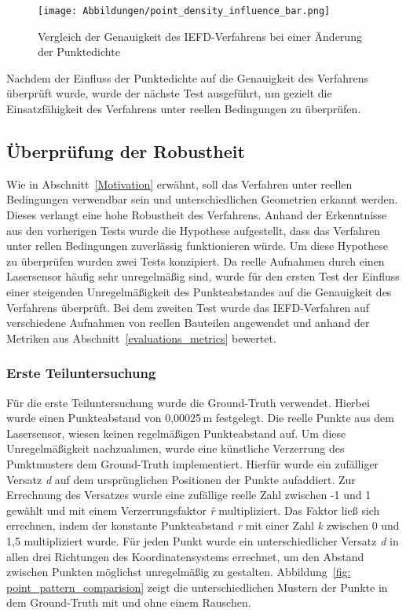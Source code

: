 \begin{figure}[t]
	\texttt{[image: Abbildungen/point\_density\_influence\_bar.png]}
	\centering
	\caption[Einfluss der Punktedichte auf die Genauigkeit]{Vergleich der Genauigkeit des IEFD-Verfahrens bei einer Änderung der Punktedichte}
	\label{fig: point_density_bar_chart}
\end{figure}

Nachdem der Einfluss der Punktedichte auf die Genauigkeit des Verfahrens überprüft wurde, wurde der nächste Test ausgeführt, um gezielt die Einsatzfähigkeit des Verfahrens unter reellen Bedingungen zu überprüfen.

\subsection{Überprüfung der Robustheit} \label{test_3}
Wie in Abschnitt~\ref{Motivation} erwähnt, soll das Verfahren unter reellen Bedingungen verwendbar sein und unterschiedlichen Geometrien erkannt werden. Dieses verlangt eine hohe Robustheit des Verfahrens. Anhand der Erkenntnisse aus den vorherigen Tests wurde die Hypothese aufgestellt, dass das Verfahren unter rellen Bedingungen zuverlässig funktionieren würde. Um diese Hypothese zu überprüfen wurden zwei Tests konzipiert. Da reelle Aufnahmen durch einen Lasersensor häufig sehr unregelmäßig sind, wurde für den ersten Test der Einfluss einer steigenden Unregelmäßigkeit des Punkteabstandes auf die Genauigkeit des Verfahrens überprüft. Bei dem zweiten Test wurde das IEFD-Verfahren auf verschiedene Aufnahmen von reellen Bauteilen angewendet und anhand der Metriken aus Abschnitt~\ref{evaluations_metrics} bewertet.

\subsubsection{Erste Teiluntersuchung} \label{test_3_part_1}
Für die erste Teiluntersuchung wurde die Ground-Truth verwendet. Hierbei wurde einen Punkteabstand von 0,00025\,\si{\m} festgelegt. Die reelle Punkte aus dem Lasersensor, wiesen keinen regelmäßigen Punkteabstand auf. Um diese Unregelmäßigkeit nachzuahmen, wurde eine künstliche Verzerrung des Punktmusters dem Ground-Truth implementiert. Hierfür wurde ein zufälliger Versatz \textit{d} auf dem ursprünglichen Positionen der Punkte aufaddiert. Zur Errechnung des Versatzes wurde eine zufällige reelle Zahl zwischen -1 und 1 gewählt und mit einem Verzerrungsfaktor \textit{\^{r}} multipliziert. Das Faktor ließ sich errechnen, indem der konstante Punkteabstand \textit{r} mit einer Zahl \textit{k} zwischen 0 und 1,5 multipliziert wurde. Für jeden Punkt wurde ein unterschiedlicher Versatz \textit{d} in allen drei Richtungen des Koordinatensystems errechnet, um den Abstand zwischen Punkten möglichst unregelmäßig zu gestalten. Abbildung~\ref{fig: point_pattern_comparision} zeigt die unterschiedlichen Mustern der Punkte in dem Ground-Truth mit und ohne einem Rauschen. 

